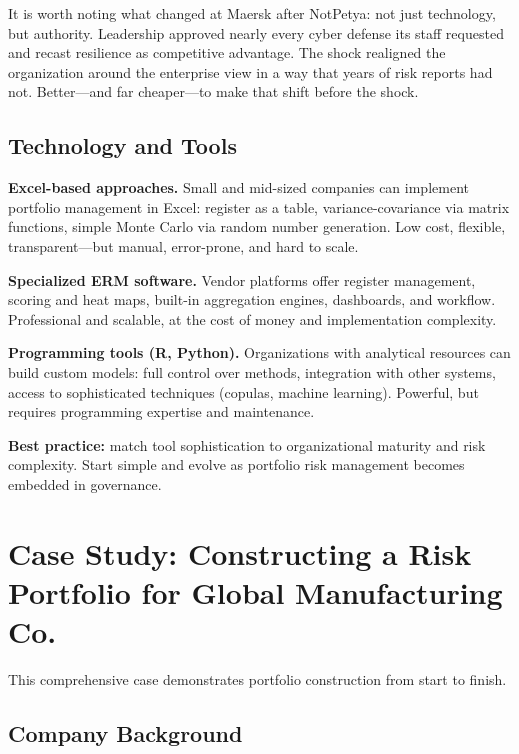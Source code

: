 \documentclass[11pt,openany]{book}
\begin{document}
It is worth noting what changed at Maersk after NotPetya: not just technology,
but authority. Leadership approved nearly every cyber defense its staff
requested and recast resilience as competitive advantage. The shock realigned
the organization around the enterprise view in a way that years of risk
reports had not. Better---and far cheaper---to make that shift before the
shock.

\subsection{Technology and Tools}
\label{subsec:technology-tools}

\textbf{Excel-based approaches.} Small and mid-sized companies can implement
portfolio management in Excel: register as a table, variance-covariance via
matrix functions, simple Monte Carlo via random number generation. Low cost,
flexible, transparent---but manual, error-prone, and hard to scale.

\textbf{Specialized ERM software.} Vendor platforms offer register management,
scoring and heat maps, built-in aggregation engines, dashboards, and workflow.
Professional and scalable, at the cost of money and implementation complexity.

\textbf{Programming tools (R, Python).} Organizations with analytical
resources can build custom models: full control over methods, integration with
other systems, access to sophisticated techniques (copulas, machine learning).
Powerful, but requires programming expertise and maintenance.

\textbf{Best practice:} match tool sophistication to organizational maturity
and risk complexity. Start simple and evolve as portfolio risk management
becomes embedded in governance.

\section{Case Study: Constructing a Risk Portfolio for Global Manufacturing Co.}
\label{sec:gmc-case}

This comprehensive case demonstrates portfolio construction from start to
finish.

\subsection{Company Background}
\label{subsec:gmc-background}
\end{document}
